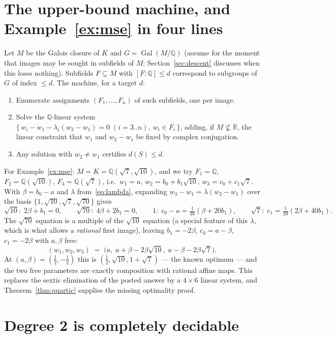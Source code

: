 \documentclass[11pt]{article}
\theoremstyle{definition}
\theoremstyle{remark}
\newcommand{\Q}{\mathbb{Q}}
\newcommand{\R}{\mathbb{R}}
\newcommand{\Gal}{\operatorname{Gal}}
\begin{document}
\section{The upper-bound machine, and Example~\ref{ex:mse} in four lines}\label{sec:upper}

Let $M$ be the Galois closure of $K$ and $G = \Gal(M/\Q)$ (assume for the moment that images
may be sought in subfields of $M$; Section~\ref{sec:descent} discusses when this loses
nothing). Subfields $F \subseteq M$ with $[F : \Q] \le d$ correspond to subgroups of $G$ of
index $\le d$. The machine, for a target $d$:

\begin{enumerate}
\item Enumerate assignments $(F_1, \dots, F_n)$ of such subfields, one per image.
\item Solve the $\Q$-linear system
$\{\, w_i - w_1 - \lambda_i (w_2 - w_1) = 0 \;(i = 3..n),\ w_i \in F_i \,\}$,
adding, if $M \not\subseteq \R$, the linear constraint that $w_1$ and $w_2 - w_1$ be fixed by
complex conjugation.
\item Any solution with $w_2 \neq w_1$ certifies $d(S) \le d$.
\end{enumerate}

For Example~\ref{ex:mse}: $M = K = \Q(\sqrt7, \sqrt{10})$, and we try
$F_1 = \Q$, $F_2 = \Q(\sqrt{10})$, $F_3 = \Q(\sqrt7)$, i.e.\
$w_1 = a$, $w_2 = b_0 + b_1\sqrt{10}$, $w_3 = c_0 + c_1\sqrt7$. With $\beta = b_0 - a$ and
$\lambda$ from~\eqref{eq:lambda}, expanding $w_3 - w_1 = \lambda (w_2 - w_1)$ over the basis
$\{1, \sqrt{10}, \sqrt7, \sqrt{70}\}$ gives
\[
\sqrt{10}:\; 2\beta + b_1 = 0, \qquad
\sqrt{70}:\; 4\beta + 2b_1 = 0, \qquad
1:\; c_0 - a = \tfrac{1}{39}(\beta + 20 b_1), \qquad
\sqrt{7}:\; c_1 = \tfrac{1}{39}(2\beta + 40 b_1).
\]
The $\sqrt{70}$ equation is a multiple of the $\sqrt{10}$ equation (a special feature of this
$\lambda$, which is what allows a \emph{rational} first image), leaving
$b_1 = -2\beta$, $c_0 = a - \beta$, $c_1 = -2\beta$ with $a, \beta$ free:
\[
(w_1, w_2, w_3) \;=\; \bigl(a,\; a + \beta - 2\beta\sqrt{10},\; a - \beta - 2\beta\sqrt7\bigr).
\]
At $(a, \beta) = (\tfrac12, -\tfrac12)$ this is $(\tfrac12, \sqrt{10}, 1 + \sqrt7)$ --- the
known optimum --- and the two free parameters are exactly composition with rational affine
maps. This replaces the sextic elimination of the posted answer by a $4 \times 6$ linear
system, and Theorem~\ref{thm:quartic} supplies the missing optimality proof.

\section{Degree 2 is completely decidable}\label{sec:d2}
\end{document}
